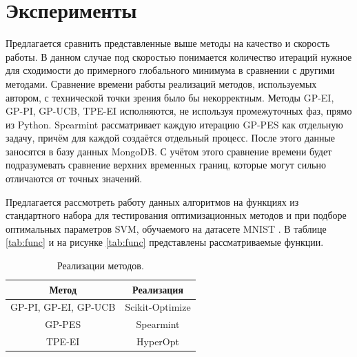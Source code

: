\documentclass[12pt,fleqn]{article}
\DeclareMathOperator*{\E}{\mathbb{E}}
\begin{document}


\section{Эксперименты}
	Предлагается сравнить представленные выше методы на качество и скорость работы. В данном случае под скоростью понимается количество итераций нужное для сходимости до примерного глобального минимума в сравнении с другими методами. Сравнение времени работы реализаций методов, используемых автором, с технической точки зрения было бы некорректным. Методы GP-EI, GP-PI, GP-UCB, TPE-EI исполняются, не используя промежуточных фаз, прямо из Python. Spearmint рассматривает каждую итерацию GP-PES как отдельную задачу, причём для каждой создаётся отдельный процесс. После этого данные заносятся в базу данных MongoDB. С учётом этого сравнение времени будет подразумевать сравнение верхних временных границ, которые могут сильно отличаются от точных значений. 
	
	Предлагается рассмотреть работу данных алгоритмов на функциях из стандартного набора для тестирования оптимизационных методов \cite{simulationlib} и при подборе оптимальных параметров SVM, обучаемого на датасете MNIST \cite{lecun-mnisthandwrittendigit-2010}. В таблице \ref{tab:func} и на рисунке \ref{tab:func} представлены рассматриваемые функции.
	
	\newpage
	
		\begin{table}[h]
		\begin{center}
			\begin{tabular}{|c|c|} 
				\hline
				Метод & Реализация \\ [0.5ex] 
				\hline\hline
				GP-PI, GP-EI, GP-UCB & Scikit-Optimize \cite{ScikitOptimizeCode} \\ 
				\hline
				GP-PES & Spearmint \cite{SpearmintCode} \\
				\hline
				TPE-EI & HyperOpt \cite{HyperoptCode} \\
				\hline
			\end{tabular}
			\caption{\label{tab:real} Реализации методов.}
		\end{center}
	\end{table}
	
\end{document}
